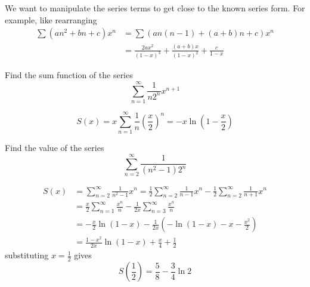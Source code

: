 \documentclass{overview}
\begin{document}
We want to manipulate the series terms to get close to the known series form.
For example, like rearranging
\[
	\begin{aligned}
		\sum (an^2 + bn + c) x^n 
		&= \sum (a n(n-1) + (a+b)n + c) x^n\\
		&= \frac{2ax^2}{(1-x)^3} + \frac{(a+b)x}{(1-x)^2} + \frac{c}{1-x}
	\end{aligned}
\] 
\begin{example}
	Find the sum function of the series
	\[
		\sum_{n=1}^{\infty} \frac{1}{n 2^n} x^{n+1}
	\] 
	\begin{answer}
		\[
			S(x) = x \sum_{n=1}^{\infty} \frac{1}{n} \left(\frac{x}{2}\right)^n
			= -x \ln\left(1-\frac{x}{2}\right)
		\] 
	\end{answer}
\end{example}
\begin{example}
	Find the value of the series
	\[
		\sum_{n=2}^{\infty} \frac{1}{(n^2-1) 2^n}
	\]
	\begin{answer}
		\[
			\begin{aligned}
				S(x) &= \sum_{n=2}^{\infty} \frac{1}{n^2-1} x^n 
				= \frac{1}{2} \sum_{n=2}^{\infty} \frac{1}{n-1} x^n
				- \frac{1}{2} \sum_{n=2}^{\infty} \frac{1}{n+1} x^n\\
						 &= \frac{x}{2} \sum_{n=1}^{\infty} \frac{x^{n}}{n}
						 - \frac{1}{2x} \sum_{n=3}^{\infty} \frac{x^{n}}{n}\\
						 &= -\frac{x}{2} \ln(1-x) - \frac{1}{2x} \left(-\ln(1-x) - x - \frac{x^2}{2}\right)\\
						 &= \frac{1-x^2}{2x} \ln(1-x) + \frac{x}{4} + \frac{1}{2}
			\end{aligned}
		\] 
		substituting $x=\frac{1}{2}$ gives
		\[
			S\left(\frac{1}{2}\right) = \frac{5}{8} -\frac{3}{4} \ln 2
		\]
	\end{answer}
\end{example}
\end{document}
